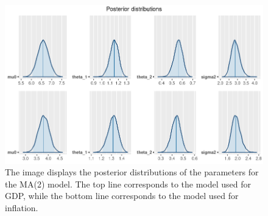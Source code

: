 \begin{figure}[h]
    \centering
    \includegraphics[width=\textwidth]{../Images/3-MA/posteriors2.png}
    \caption{The image displays the posterior distributions of the parameters for the MA(2) model. The top line corresponds to the model used for GDP, while the bottom line corresponds to the model used for inflation.}
    \label{fig:MA2_posteriors}
\end{figure}

